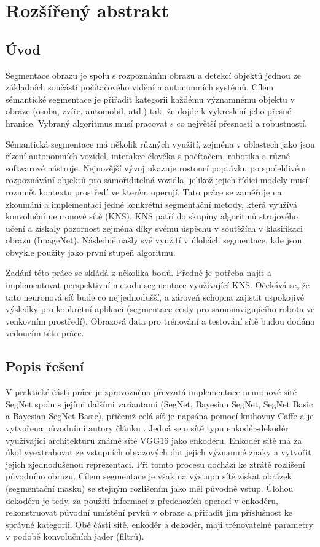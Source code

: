 \chapter*{Rozšířený abstrakt}

\section*{Úvod}

Segmentace obrazu je spolu s rozpoznáním obrazu a detekcí objektů jednou ze základních součástí počítačového vidění a autonomních systémů. Cílem sémantické segmentace je přiřadit kategorii každému významnému objektu v obraze (osoba, zvíře, automobil, atd.) tak, že dojde k vykreslení jeho přesné hranice. Vybraný algoritmus musí pracovat s co největší přesností a robustností.

Sémantická segmentace má několik různých využití, zejména v oblastech jako jsou řízení autonomních vozidel, interakce člověka s počítačem, robotika a různé softwarové nástroje. Nejnovější vývoj ukazuje rostoucí poptávku po spolehlivém rozpoznávání objektů pro samořiditelná vozidla, jelikož jejich řídící modely musí rozumět kontextu prostředí ve kterém operují. Tato práce se zaměřuje na zkoumání a implementaci jedné konkrétní segmentační metody, která využívá konvoluční neuronové sítě (KNS). KNS patří do skupiny algoritmů strojového učení a získaly pozornost zejména díky svému úspěchu v soutěžích v klasifikaci obrazu (ImageNet). Následně našly své využití v úlohách segmentace, kde jsou obvykle použity jako první stupeň algoritmu. 

Zadání této práce se skládá z několika bodů. Předně je potřeba najít a implementovat perspektivní metodu segmentace využívající KNS. Očekává se, že tato neuronová síť bude co nejjednodušší, a zároveň schopna zajistit uspokojivé výsledky pro konkrétní aplikaci (segmentace cesty pro samonavigujícího robota ve venkovním prostředí). Obrazová data pro trénování a testování sítě budou dodána vedoucím této práce. 

\section*{Popis řešení}

V praktické části práce je zprovozněna převzatá implementace neuronové sítě SegNet spolu s jejími dalšími variantami (SegNet, Bayesian SegNet, SegNet Basic a Bayesian SegNet Basic), přičemž celá síť je napsána pomocí knihovny Caffe a je vytvořena původními autory článku \cite{segnet}. Jedná se o sítě typu enkodér-dekodér využívající architekturu známé sítě VGG16 jako enkodéru. Enkodér sítě má za úkol vyextrahovat ze vstupních obrazových dat jejich významné znaky a vytvořit jejich zjednodušenou reprezentaci. Při tomto procesu dochází ke ztrátě rozlišení původního obrazu. Cílem segmentace je však na výstupu sítě získat obrázek (segmentační masku) se stejným rozlišením jako měl původně vstup. Úlohou dekodéru je tedy, za použití informací z předchozích operací v enkodéru, rekonstruovat původní umístění prvků v obraze a přiřadit jim příslušnost ke správné kategorii. Obě části sítě, enkodér a dekodér, mají trénovatelné parametry v podobě konvolučních jader (filtrů). 

